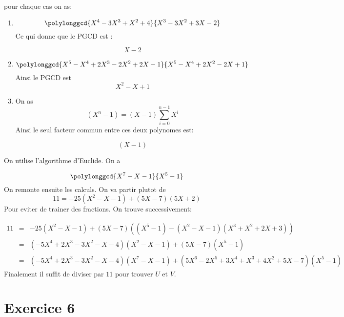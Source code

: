 \documentclass{report}
\begin{document}
\begin{myproof}
  pour chaque cas on as:
  \begin{enumerate}
    \item 
      $$
      \polylonggcd{X^4-3X^3 + X^2 + 4}{X^3-3X^2+3X-2}
      $$
      Ce qui donne que le PGCD est :

      $$
      X - 2
      $$
    \item 
      $$
      \polylonggcd{X^5-X^4+2X^3-2X^2+2X-1}{X^5-X^4+2X^2-2X+1}
      $$
      Ainsi le PGCD est
      $$
      X^2 - X + 1
      $$
    \item 

      On as 
      $$
      (X^n - 1) = (X - 1)\sum_{i=0}^{n-1}X^i
      $$
      Ainsi le seul facteur commun entre ces deux polynomes est:

      $$
      (X - 1)
      $$
  \end{enumerate}

\end{myproof}


\begin{myproof}
  On utilise l'algorithme d'Euclide. On a

  $$
  \polylonggcd{X^7-X -1}{X^5-1}
  $$
  On remonte ensuite les calculs. On va partir plutot de 
  $$
  11 = -25(X^2 - X - 1) + (5X-7)(5X+2)
  $$
  Pour eviter de trainer des fractions. On trouve successivement:

  \begin{eqnarray*}
    11 &= & -25(X^2 - X - 1) + (5X - 7)\left((X^5-1) - (X^2-X-1)(X^3+X^2+2X+3)\right)\\[4pt]
       & =& \left(-5X^4 + 2X^3 - 3X^2-X -4\right)\left(X^2-X-1\right) + \left(5X -7\right)\left(X^5-1\right)\\[4pt]
       &=&(-5X^4 + 2X^3 - 3X^2 -X -4)(X^7-X-1) + (5X^6-2X^5+3X^4+X^3+4X^2+5X-7)(X^5-1)
  \end{eqnarray*}
  Finalement il suffit de diviser par $11$ pour trouver $U$ et $V$.
\end{myproof}


\section{Exercice 6} %
\label{sec:Exercice 6}
\end{document}
